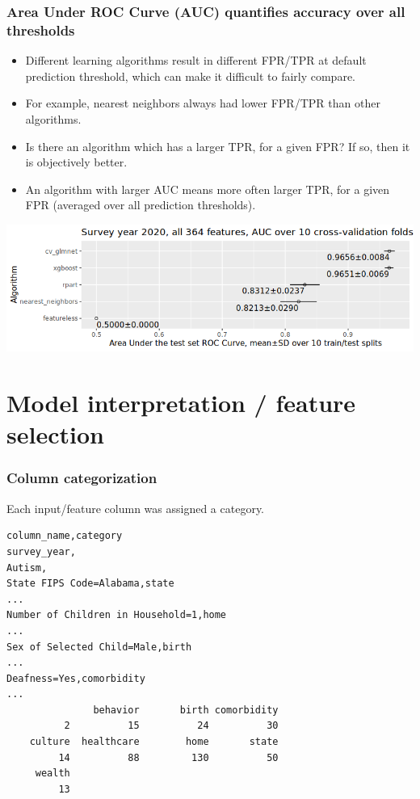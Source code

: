 \documentclass{beamer}
\begin{document}
\begin{frame}
  \frametitle{Area Under ROC Curve (AUC) quantifies accuracy over all thresholds}
  \begin{itemize}
  \item Different learning algorithms result in different FPR/TPR at
    default prediction threshold, which can make it difficult to
    fairly compare.
  \item For example, nearest neighbors always had lower FPR/TPR than other
    algorithms.
  \item Is there an algorithm which has a larger TPR, for a given FPR?
    If so, then it is objectively better.
  \item An algorithm with larger AUC means more often larger TPR, for
    a given FPR (averaged over all prediction thresholds).
  \end{itemize}
  \includegraphics[width=\textwidth]{download-nsch-mlr3batchmark-registry-one-set-all-features-auc.png}
\end{frame}

\section{Model interpretation / feature selection}

\begin{frame}[fragile]
  \frametitle{Column categorization}
Each input/feature column was assigned a category.
\begin{verbatim}
column_name,category
survey_year,
Autism,
State FIPS Code=Alabama,state
...
Number of Children in Household=1,home
...
Sex of Selected Child=Male,birth
...
Deafness=Yes,comorbidity
...
               behavior       birth comorbidity 
          2          15          24          30 
    culture  healthcare        home       state 
         14          88         130          50 
     wealth 
         13 
\end{verbatim}
\end{frame}
\end{document}
